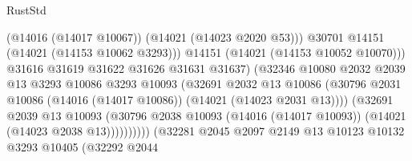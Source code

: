\begin{lexlean}{RustStd}
\begin{coremodule}
                                                (@14016 (@14017 @10067))
                                                (@14021 (@14023 @2020 @53)))
                                              @30701
                                              @14151
                                              (@14021 (@14153 @10062 @3293)))
                                            @14151
                                            (@14021 (@14153 @10052 @10070)))
                                          @31616
                                          @31619
                                          @31622
                                          @31626
                                          @31631
                                          @31637)
                                        (@32346
                                          @10080
                                          @2032
                                          @2039
                                          @13
                                          @3293
                                          @10086
                                          @3293
                                          @10093
                                          (@32691
                                            @2032
                                            @13
                                            @10086
                                            (@30796
                                              @2031
                                              @10086
                                              (@14016 (@14017 @10086))
                                              (@14021 (@14023 @2031 @13))))
                                          (@32691
                                            @2039
                                            @13
                                            @10093
                                            (@30796
                                              @2038
                                              @10093
                                              (@14016 (@14017 @10093))
                                              (@14021 (@14023 @2038 @13))))))))))
                              (@32281
                                @2045
                                @2097
                                @2149
                                @13
                                @10123
                                @10132
                                @3293
                                @10405
                                (@32292
                                  @2044

\end{coremodule}
\end{lexlean}
